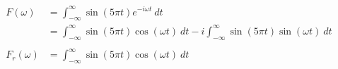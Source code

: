 \documentclass[preview]{standalone}
\begin{document}
\begin{align*}
F(\omega)&=\int_{-\infty}^{\infty}\sin(5\pi t)e^{-i\omega t} \ dt \\ &=\int_{-\infty}^{\infty}\sin(5\pi t)\cos{(\omega t) \ dt-i\int_{-\infty}^{\infty}\sin(5\pi t)}\sin{(\omega t)} \ dt \\ \\ F_{r}(\omega)&=\int_{-\infty}^{\infty}\sin(5\pi t)\cos{(\omega t) \ dt}
\end{align*}
\end{document}
